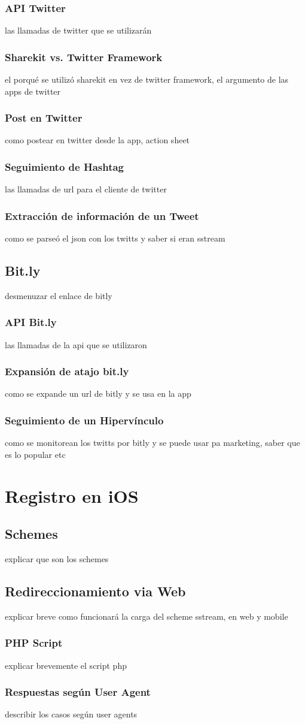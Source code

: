 		\subsubsection{API Twitter}
		las llamadas de twitter que se utilizarán
		\subsubsection{Sharekit vs. Twitter Framework}
		el porqué se utilizó sharekit en vez de twitter framework, el argumento de las apps de twitter
		\subsubsection{Post en Twitter}
		como postear en twitter desde la app, action sheet
		\subsubsection{Seguimiento de Hashtag}
		las llamadas de url para el cliente de twitter
		\subsubsection{Extracción de información de un Tweet}
		como se parseó el json con los twitts y saber si eran sstream
	\subsection{Bit.ly}
		desmenuzar el enlace de bitly
		\subsubsection{API Bit.ly}
		las llamadas de la api que se utilizaron
		\subsubsection{Expansión de atajo bit.ly}
		como se expande un url de bitly y se usa en la app
		\subsubsection{Seguimiento de un Hipervínculo}		
		como se monitorean los twitts por bitly y se puede usar pa marketing, saber que es lo popular etc		

\clearpage
\section{Registro en iOS}
	\subsection{Schemes}
	explicar que son los schemes
	\subsection{Redireccionamiento via Web}
	explicar breve como funcionará la carga del scheme sstream, en web y mobile
		\subsubsection{PHP Script}
		explicar brevemente el script php 
		\subsubsection{Respuestas según User Agent}
		describir los casos según user agents
		
		